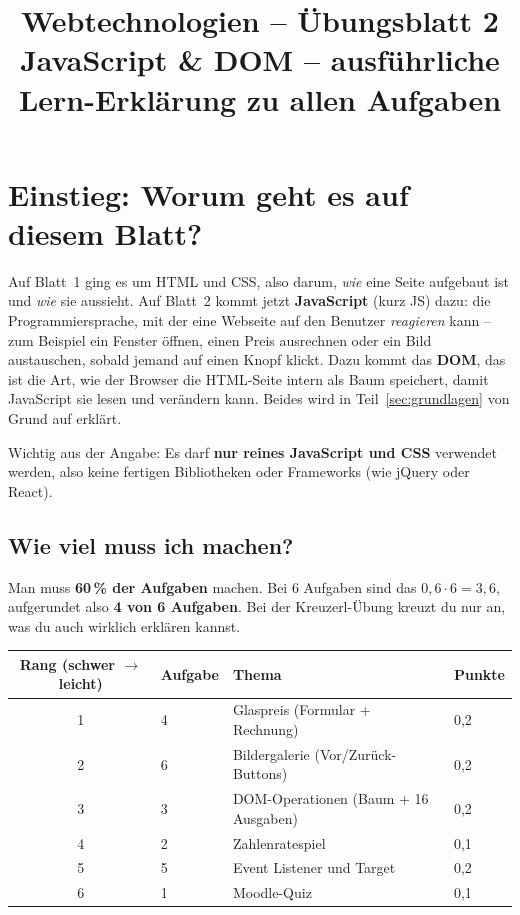 \documentclass[a4paper,11pt]{article}
\title{\textbf{Webtechnologien -- Übungsblatt 2}\\[0.3em]
\large JavaScript \& DOM -- ausführliche Lern-Erklärung zu allen Aufgaben}
\author{}
\date{}
\begin{document}
\maketitle
\vspace{-2em}
\tableofcontents
\newpage

\section{Einstieg: Worum geht es auf diesem Blatt?}

Auf Blatt~1 ging es um HTML und CSS, also darum, \emph{wie} eine Seite aufgebaut ist und \emph{wie} sie aussieht.
Auf Blatt~2 kommt jetzt \textbf{JavaScript} (kurz JS) dazu: die Programmiersprache, mit der eine Webseite
auf den Benutzer \emph{reagieren} kann -- zum Beispiel ein Fenster öffnen, einen Preis ausrechnen oder
ein Bild austauschen, sobald jemand auf einen Knopf klickt. Dazu kommt das \textbf{DOM}, das ist die Art, wie der
Browser die HTML-Seite intern als Baum speichert, damit JavaScript sie lesen und verändern kann.
Beides wird in Teil~\ref{sec:grundlagen} von Grund auf erklärt.

Wichtig aus der Angabe: Es darf \textbf{nur reines JavaScript und CSS} verwendet werden, also keine fertigen
Bibliotheken oder Frameworks (wie jQuery oder React).

\subsection*{Wie viel muss ich machen?}

Man muss \textbf{60\,\% der Aufgaben} machen. Bei 6 Aufgaben sind das $0{,}6 \cdot 6 = 3{,}6$, aufgerundet also
\textbf{4 von 6 Aufgaben}. Bei der Kreuzerl-Übung kreuzt du nur an, was du auch wirklich erklären kannst.

\begin{center}
\begin{tabular}{@{}clll@{}}
\toprule
Rang (schwer $\to$ leicht) & Aufgabe & Thema & Punkte\\
\midrule
1 & 4 & Glaspreis (Formular + Rechnung) & 0,2\\
2 & 6 & Bildergalerie (Vor/Zurück-Buttons) & 0,2\\
3 & 3 & DOM-Operationen (Baum + 16 Ausgaben) & 0,2\\
4 & 2 & Zahlenratespiel & 0,1\\
5 & 5 & Event Listener und Target & 0,2\\
6 & 1 & Moodle-Quiz & 0,1\\
\bottomrule
\end{tabular}
\end{center}
\end{document}
